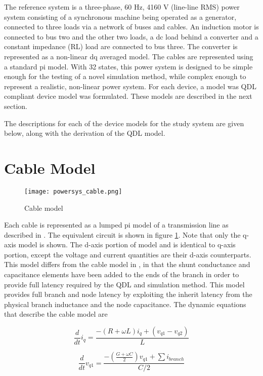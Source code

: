 The reference system is a three-phase, 60 Hz, 4160 V (line-line RMS) power system consisting of a synchronous machine being operated as a generator, connected to three loads via a network of buses and cables. An induction motor is connected to bus two and the other two loads, a dc load behind a converter and a constant impedance (RL) load are connected to bus three. The converter is represented as a non-linear dq averaged model. The cables are represented using a standard pi model. With 32 states, this power system is designed to be simple enough for the testing of a novel simulation method, while complex enough to represent a realistic, non-linear power system. For each device, a model was QDL compliant device model was formulated. These models are described in the next section.

The descriptions for each of the device models for the study system are given below, along with the derivation of the QDL model.

\section{Cable Model}

\begin{figure}[h]
    \label{fig:powersys_cable}
    \centering
    \texttt{[image: powersys\_cable.png]}
    \caption{Cable model}
\end{figure}

Each cable is represented as a lumped pi model of a transmission line as described in \cite{gholizadeh2021}. The equivalent circuit is shown in figure \ref{fig:powersys_cable}. Note that only the q-axis model is shown. The d-axis portion of model and is identical to q-axis portion, except the voltage and current quantities are their d-axis counterparts. This model differs from the cable model in \cite{gholizadeh2021}, in that the shunt conductance and capacitance elements have been added to the ends of the branch in order to provide full latency required by the QDL and simulation method. This model provides full branch and node latency by exploiting the inherit latency from the physical branch inductance and the node capacitance. The dynamic equations that describe the cable model are 

\begin{equation} \label{eq:cable_iq}
\frac{d}{dt}i_{q}=\frac{-(R+\omega L)i_{q}+(v_{q1}-v_{q2})}{L}    
\end{equation}

\begin{equation} \label{eq:cable_vq1}
    \frac{d}{dt}v_{q1}=\frac{-(\frac{G+\omega C}{2})v_{q1}+\sum{i_{branch}}}{C/2}    
\end{equation}

